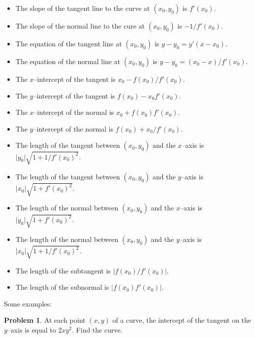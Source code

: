 \documentclass{scrartcl}
\theoremstyle{definition}
\newtheorem*{problem*}{Problem}
\begin{document}
\begin{itemize}
\item The slope of the tangent line to the curve at $(x_0,y_0)$ is $f'(x_0)$.
\item The slope of the normal line to the cure at $(x_0,y_0)$ is $-1/f'(x_0)$.
\item The equation of the tangent line at $(x_0,y_0)$ is $y-y_0=y'(x-x_0)$.
\item The equation of the normal line at $(x_0,y_0)$ is $y-y_0 = (x_0-x)/f'(x_0)$.
\item The $x$--intercept of the tangent is $x_0-f(x_0)/f'(x_0)$.
\item The $y$--intercept of the tangent is $f(x_0)-x_0 f'(x_0)$.
\item The $x$--intercept of the normal is $x_0+f(x_0)f'(x_0)$.
\item The $y$--intercept of the normal is $f(x_0)+x_0/f'(x_0)$.
\item The length of the tangent between $(x_0,y_0)$ and the $x$--axis is $\lvert y_0 \rvert\sqrt{1+1/f'(x_0)^2}$.
\item The length of the tangent between $(x_0,y_0)$ and the $y$--axis is $\lvert x_0 \rvert\sqrt{1+f'(x_0)^2}$.
\item The length of the normal between $(x_0,y_0)$ and the $x$--axis is $\lvert y_0 \rvert\sqrt{1+f'(x_0)^2}$.
\item The length of the normal between $(x_0,y_0)$ and the $y$--axis is $\lvert x_0 \rvert \sqrt{1+1/f'(x_0)^2}$.
\item The length of the subtangent is $\lvert f(x_0)/f'(x_0) \rvert$.
\item The length of the subnormal is $\lvert f(x_0) f'(x_0) \rvert$.
\end{itemize}

Some examples:
\begin{problem*}
At each point $(x,y)$ of a curve, the intercept of the tangent on the $y$--axis is equal to $2xy^2$.  Find the curve.
\end{problem*}

\begin{center}
\end{center}
\end{document}
